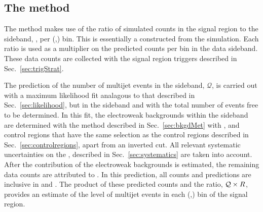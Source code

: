 \subsection{The method}
\label{sec:qcdMethod}

The method makes use of the ratio of simulated \QCD counts in the
signal region to the \mhtmet sideband, \rmhtmet, per (\HT,\nj) bin.
This is essentially a \TF constructed from the \QCD simulation.
Each ratio is used as a multiplier on the predicted \QCD counts per
bin in the \mhtmet data sideband.  These data counts are collected
with the signal region triggers described in Sec.~\ref{sec:trigStrat}. 

The prediction of the number of \QCD multijet events in
the sideband, $\mathcal{Q}$, is carried out with a maximum likelihood fit analagous to
that described in Sec.~\ref{sec:likelihood}, but in the \mhtmet
sideband and with the total number of \QCD events free to be
determined. In this fit,
the electroweak backgrounds within the sideband are determined with the method described
in Sec.~\ref{sec:bkgdMet} with \mj, \mmj and \gj
control regions that have the same selection as the control
regions described in Sec.~\ref{sec:controlregions}, apart from an inverted
\mhtmet cut. All relevant systematic uncertainties on the \TFs,
described in Sec.~\ref{sec:systematics} are taken into account.  After the
contribution of the electroweak backgrounds is estimated, the
remaining data counts are attributed to \QCD. In this prediction, all
counts and predictions are inclusive in \nb and \MHT. The product of these
predicted \QCD counts and the ratio, $\mathcal{Q} \times \mbox{$R$}$,
provides an estimate of the level of \QCD multijet events in each
(\HT,\nj) bin of the signal region. 

